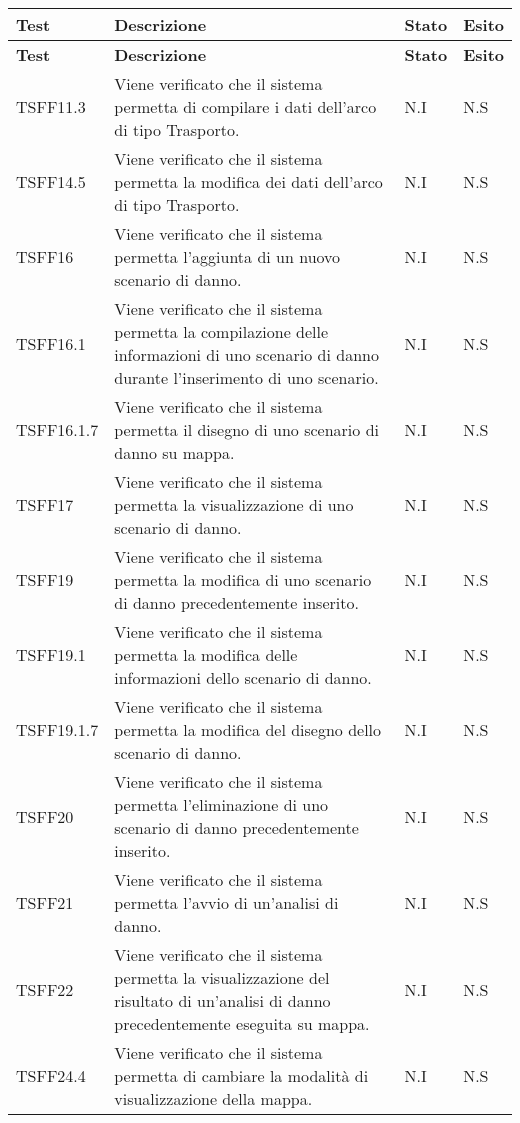	\def\arraystretch{1.5}
	\begin{longtable}{p{1.5cm}!{\VRule[1pt]}p{5cm}!{\VRule[1pt]}p{1cm}!{\VRule[1pt]}p{1cm}}
		\color{white} \textbf{Test} & \color{white} \textbf{Descrizione} & \color{white} \textbf{Stato} & \color{white} \textbf{Esito} \\ 
		\endfirsthead 
		\color{white} \textbf{Test} & \color{white} \textbf{Descrizione} & \color{white} \textbf{Stato} & \color{white} \textbf{Esito} \\ 
		\endhead 
		TSFF11.3 & Viene verificato che il sistema permetta di compilare i dati dell'arco di tipo Trasporto. & N.I & N.S \\ 
		TSFF14.5 & Viene verificato che il sistema permetta la modifica dei dati dell'arco di tipo Trasporto. & N.I & N.S \\ 
		TSFF16 & Viene verificato che il sistema permetta l'aggiunta di un nuovo scenario di danno. & N.I & N.S \\ 
		TSFF16.1 & Viene verificato che il sistema permetta la compilazione delle informazioni di uno scenario di danno durante l'inserimento di uno scenario. & N.I & N.S \\ 
		TSFF16.1.7 & Viene verificato che il sistema permetta il disegno di uno scenario di danno su mappa. & N.I & N.S \\ 
		TSFF17 & Viene verificato che il sistema permetta la visualizzazione di uno scenario di danno. & N.I & N.S \\ 
		TSFF19 & Viene verificato che il sistema permetta la modifica di uno scenario di danno precedentemente inserito. & N.I & N.S \\ 
		TSFF19.1 & Viene verificato che il sistema permetta la modifica delle informazioni dello scenario di danno. & N.I & N.S \\ 
		TSFF19.1.7 & Viene verificato che il sistema permetta la modifica del disegno dello scenario di danno. & N.I & N.S \\ 
		TSFF20 & Viene verificato che il sistema permetta l'eliminazione di uno scenario di danno precedentemente inserito. & N.I & N.S \\ 
		TSFF21 & Viene verificato che il sistema permetta l'avvio di un'analisi di danno. & N.I & N.S \\ 
		TSFF22 & Viene verificato che il sistema permetta la visualizzazione del risultato di un'analisi di danno precedentemente eseguita su mappa. & N.I & N.S \\ 
		TSFF24.4 & Viene verificato che il sistema permetta di cambiare la modalità di visualizzazione della mappa. & N.I & N.S \\ 

\end{longtable}

